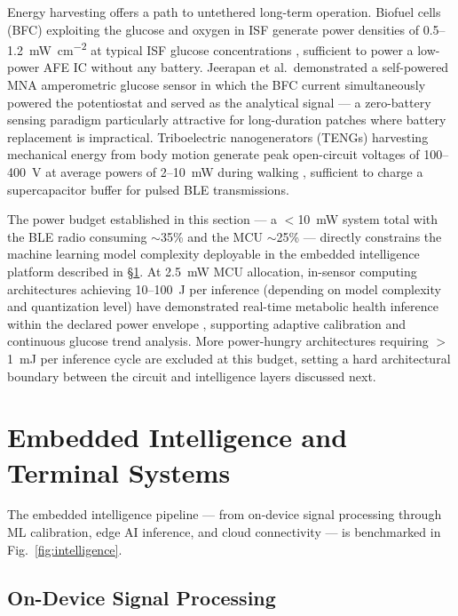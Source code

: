 \documentclass[review,1p]{elsarticle}
\begin{document}
Energy harvesting offers a path to untethered long-term operation. Biofuel cells (BFC) exploiting the glucose and oxygen in ISF generate power densities of 0.5--1.2~mW~cm\textsuperscript{$-2$} at typical ISF glucose concentrations \cite{Jeerapan2021BFC}, sufficient to power a low-power AFE IC without any battery. Jeerapan et al.\ demonstrated a self-powered MNA amperometric glucose sensor in which the BFC current simultaneously powered the potentiostat and served as the analytical signal — a zero-battery sensing paradigm particularly attractive for long-duration patches where battery replacement is impractical. Triboelectric nanogenerators (TENGs) harvesting mechanical energy from body motion generate peak open-circuit voltages of 100--400~V at average powers of 2--10~mW during walking \cite{Pu2023TENG}, sufficient to charge a supercapacitor buffer for pulsed BLE transmissions.

The power budget established in this section — a $<$10~mW system total with the BLE radio consuming $\sim$35\% and the MCU $\sim$25\% — directly constrains the machine learning model complexity deployable in the embedded intelligence platform described in \S\ref{sec:intelligence}. At 2.5~mW MCU allocation, in-sensor computing architectures achieving 10--100~\textmu{}J per inference (depending on model complexity and quantization level) have demonstrated real-time metabolic health inference within the declared power envelope \cite{Fan2026EdgeAI}, supporting adaptive calibration and continuous glucose trend analysis. More power-hungry architectures requiring $>$1~mJ per inference cycle are excluded at this budget, setting a hard architectural boundary between the circuit and intelligence layers discussed next.


\section{Embedded Intelligence and Terminal Systems}
\label{sec:intelligence}

The embedded intelligence pipeline — from on-device signal processing through ML calibration, edge AI inference, and cloud connectivity — is benchmarked in Fig.~\ref{fig:intelligence}.

\subsection{On-Device Signal Processing}
\label{subsec:signal_proc}
\end{document}
